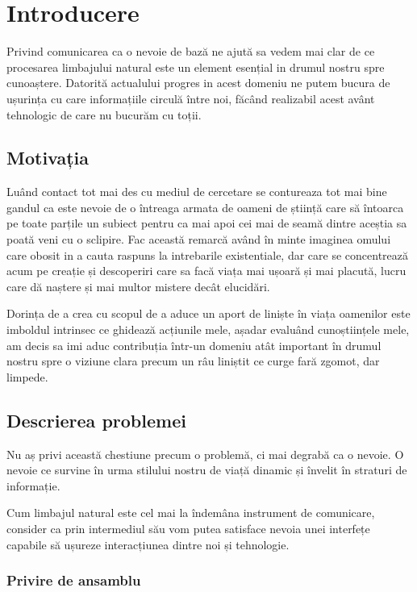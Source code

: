 \chapter{Introducere}

Privind comunicarea ca o nevoie de bază ne ajută sa vedem mai clar de ce procesarea limbajului natural este un element esențial in drumul nostru spre cunoaștere. Datorită actualului progres in acest domeniu ne putem bucura de ușurința cu care informațiile circulă între noi, făcând realizabil acest avânt tehnologic de care nu bucurăm cu toții.

\section{Motivația}

Luând contact tot mai des cu mediul de cercetare se contureaza tot mai bine gandul ca este nevoie de o întreaga armata de oameni de știință care să întoarca pe toate parțile un subiect pentru ca mai apoi cei mai de seamă dintre aceștia sa poată veni cu o sclipire. Fac această remarcă având în minte imaginea omului care obosit in a cauta raspuns la intrebarile existentiale, dar care se concentrează acum pe creație și descoperiri care sa facă viața mai ușoară și mai placută, lucru care dă naștere și mai multor mistere decât elucidări.

Dorința de a crea cu scopul de a aduce un aport de liniște în viața oamenilor este imboldul intrinsec ce ghidează acțiunile mele, așadar evaluând cunoștiințele mele, am decis sa imi aduc contribuția într-un domeniu atât important în drumul nostru spre o viziune clara precum un râu liniștit ce curge fară zgomot, dar limpede.


\section{Descrierea problemei}

Nu aș privi această chestiune precum o problemă, ci mai degrabă ca o nevoie. O nevoie ce survine în urma stilului nostru de viață dinamic și învelit în straturi de informație.

Cum limbajul natural este cel mai la îndemâna instrument de comunicare, consider ca prin intermediul său vom putea satisface nevoia unei interfețe capabile să ușureze interacțiunea dintre noi și tehnologie.

\subsection{Privire de ansamblu}

